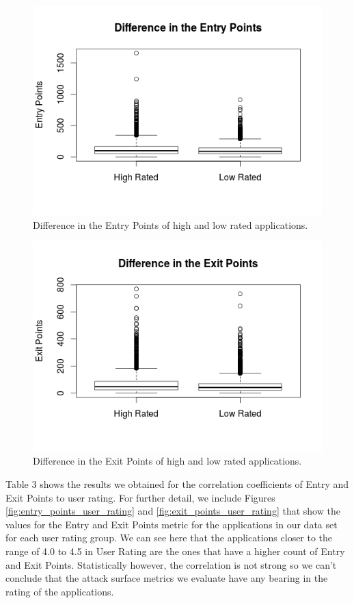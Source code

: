 \documentclass{sig-alternate}
\begin{document}
\begin{figure}
  \centering
  \includegraphics[scale=0.50]{figs/boxplot_entry_points.png}
  \caption{Difference in the Entry Points of high and low rated applications.}
  \label{fig:boxplot_entry_points}
\end{figure}

\begin{figure}
  \centering
  \includegraphics[scale=0.50]{figs/boxplot_exit_points.png}
  \caption{Difference in the Exit Points of high and low rated applications.}  
  \label{fig:boxplot_exit_points}
\end{figure}

Table 3 shows the results we obtained for the correlation coefficients of Entry and Exit Points to user rating. For further detail, we include Figures \ref{fig:entry_points_user_rating} and \ref{fig:exit_points_user_rating} that show the values for the Entry and Exit Points metric for the applications in our data set for each user rating group. We can see here that the applications closer to the range of 4.0 to 4.5 in User Rating are the ones that have a higher count of Entry and Exit Points. Statistically however, the correlation is not strong so we can't conclude that the attack surface metrics we evaluate have any bearing in the rating of the applications.
\end{document}
